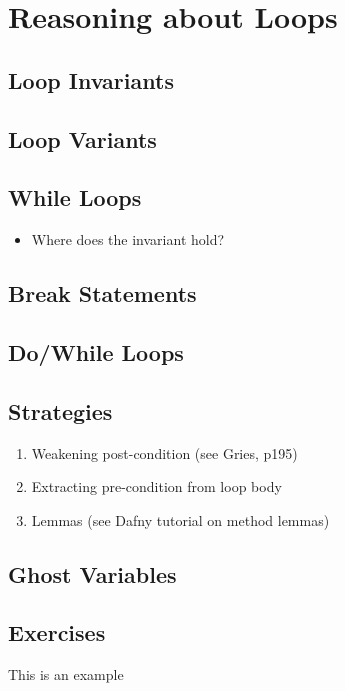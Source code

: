 \chapter{Reasoning about Loops}
\label{c_reasoning_loops}

\section{Loop Invariants}
\section{Loop Variants}
\section{While Loops}
\begin{itemize}
\item Where does the invariant hold?
\end{itemize}
\section{Break Statements}
\section{Do/While Loops}
\section{Strategies}
\begin{enumerate}
\item Weakening post-condition (see Gries, p195)
\item Extracting pre-condition from loop body
\item Lemmas (see Dafny tutorial on method lemmas)
\end{enumerate}
\section{Ghost Variables}


\section{Exercises}

\begin{ex}
This is an example
\end{ex}
